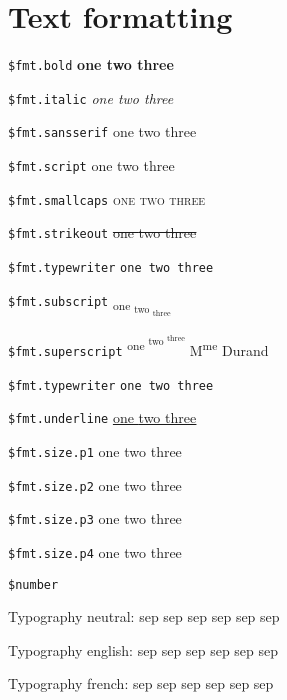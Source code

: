 \documentclass[demo]{pyscribe}
\newcommand\scripttext[1]{{\fontfamily{pzc}\selectfont\large#1}}
\begin{document}
\section{Text formatting}



\par\medskip
\texttt{\$fmt.bold}  \textbf{one
 \textbf{two
 \textbf{three}}}
\par\medskip
\texttt{\$fmt.italic}  \textit{one
 \textit{two
 \textit{three}}}
\par\medskip
\texttt{\$fmt.sansserif}  \textsf{one
 \textsf{two
 \textsf{three}}}
\par\medskip
\texttt{\$fmt.script}  \scripttext{one
 \scripttext{two
 \scripttext{three}}}
\par\medskip
\texttt{\$fmt.smallcaps}  \textsc{one
 \textsc{two
 \textsc{three}}}
\par\medskip
\texttt{\$fmt.strikeout}  \sout{one
 \sout{two
 \sout{three}}}
\par\medskip
\texttt{\$fmt.typewriter}  \texttt{one
 \texttt{two
 \texttt{three}}}
\par\medskip
\texttt{\$fmt.subscript}  \textsubscript{one
 \textsubscript{two
 \textsubscript{three}}}
\par\medskip
\texttt{\$fmt.superscript}  \textsuperscript{one
 \textsuperscript{two
 \textsuperscript{three}}} M\textsuperscript{me} Durand
\par\medskip
\texttt{\$fmt.typewriter}  \texttt{one
 \texttt{two
 \texttt{three}}}
\par\medskip
\texttt{\$fmt.underline}  \underline{one
 \underline{two
 \underline{three}}}
\par\medskip
\texttt{\$fmt.size.p1}  {\large one
 {\large two
 {\large three}}}
\par\medskip
\texttt{\$fmt.size.p2}  {\Large one
 {\Large two
 {\Large three}}}
\par\medskip
\texttt{\$fmt.size.p3}  {\LARGE one
 {\LARGE two
 {\LARGE three}}}
\par\medskip
\texttt{\$fmt.size.p4}  {\Huge one
 {\Huge two
 {\Huge three}}}

\par\medskip
\texttt{\$number} \\ 
\medskip
\par{\raggedright
Typography neutral:
sep 
sep 
sep 
sep 
sep 
sep 
\par \medskip
Typography english:
sep 
sep 
sep 
sep 
sep 
sep 
\par \medskip
Typography french:
sep 
sep 
sep 
sep 
sep 
sep 
\par \medskip\par}
\end{document}
